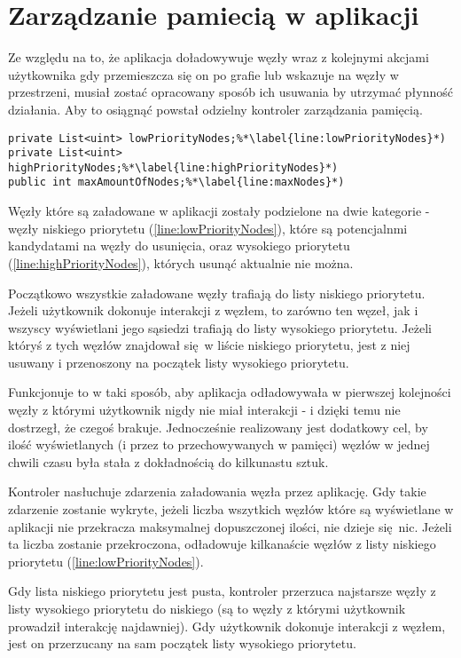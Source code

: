 \section{Zarządzanie pamiecią w aplikacji}
\label{sec:pamiec}
Ze względu na to, że aplikacja doładowywuje węzły wraz z kolejnymi akcjami użytkownika gdy przemieszcza się on po grafie lub wskazuje na węzły w przestrzeni, musiał zostać opracowany sposób ich usuwania by utrzymać płynność działania. Aby to osiągnąć powstał odzielny kontroler zarządzania pamięcią.

\begin{lstlisting}[caption={Pomocnicze struktury i zmienne kontrolera zarządzania pamięcią}, label=lst:nodePriority]
private List<uint> lowPriorityNodes;%*\label{line:lowPriorityNodes}*)
private List<uint> highPriorityNodes;%*\label{line:highPriorityNodes}*)
public int maxAmountOfNodes;%*\label{line:maxNodes}*)
\end{lstlisting}

Węzły które są załadowane w aplikacji zostały podzielone na dwie kategorie - węzły niskiego priorytetu (\ref{line:lowPriorityNodes}), które są potencjalnmi kandydatami na węzły do usunięcia, oraz wysokiego priorytetu (\ref{line:highPriorityNodes}), których usunąć aktualnie nie można.

Początkowo wszystkie załadowane węzły trafiają do listy niskiego priorytetu. Jeżeli użytkownik dokonuje interakcji z węzłem, to zarówno ten węzeł, jak i wszyscy wyświetlani jego sąsiedzi trafiają do listy wysokiego priorytetu. Jeżeli któryś z tych węzłów znajdował się w liście niskiego priorytetu, jest z niej usuwany i przenoszony na początek listy wysokiego priorytetu.

Funkcjonuje to w taki sposób, aby aplikacja odładowywała w pierwszej kolejności węzły z którymi użytkownik nigdy nie miał interakcji - i dzięki temu nie dostrzegł, że czegoś brakuje. Jednocześnie realizowany jest dodatkowy cel, by ilość wyświetlanych (i przez to przechowywanych w pamięci) węzłów w jednej chwili czasu była stała z dokładnością do kilkunastu sztuk.

Kontroler nasłuchuje zdarzenia załadowania węzła przez aplikację. Gdy takie zdarzenie zostanie wykryte, jeżeli liczba wszytkich węzłów które są wyświetlane w aplikacji nie przekracza maksymalnej dopuszczonej ilości, nie dzieje się nic. Jeżeli ta liczba zostanie przekroczona, odładowuje kilkanaście węzłów z listy niskiego priorytetu (\ref{line:lowPriorityNodes}).

Gdy lista niskiego priorytetu jest pusta, kontroler przerzuca najstarsze węzły z listy wysokiego priorytetu do niskiego (są to węzły z którymi użytkownik prowadził interakcję najdawniej). Gdy użytkownik dokonuje interakcji z węzłem, jest on przerzucany na sam początek listy wysokiego priorytetu.